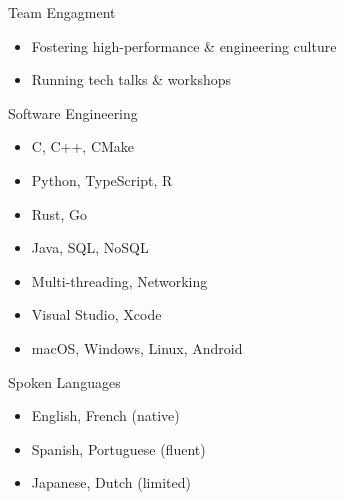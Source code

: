 \documentclass[a4paper,10pt]{article}
\newcommand{\subskill}[1]{
  \vspace{0.8em}
  {\color{vlightblue} #1}
  \vspace{0.3em}
}
\begin{document}
{\begin{minipage}[t]{0.24\textwidth}
{\begin{minipage}[t][\textheight]{\dimexpr\textwidth-10pt}
        \subskill{Team Engagment}
        \begin{itemize}[leftmargin=1em, nosep]
            \item Fostering high-performance \& engineering culture
            \item Running tech talks \& workshops
        \end{itemize}
        \vspace{0.5em}

        \subskill{Software Engineering}
        \begin{itemize}[leftmargin=1em, nosep]
            \item C, C++, CMake
            \item Python, TypeScript, R
            \item Rust, Go
            \item Java, SQL, NoSQL
            \item Multi-threading, Networking
            \item Visual Studio, Xcode
            \item macOS, Windows, Linux, Android
        \end{itemize}
        \vspace{0.5em}

        \subskill{Spoken Languages}
        \begin{itemize}[leftmargin=1em, nosep]
            \item English, French (native)
            \item Spanish, Portuguese (fluent)
            \item Japanese, Dutch (limited)
        \end{itemize}


\end{minipage}}
\end{minipage}}
\end{document}
